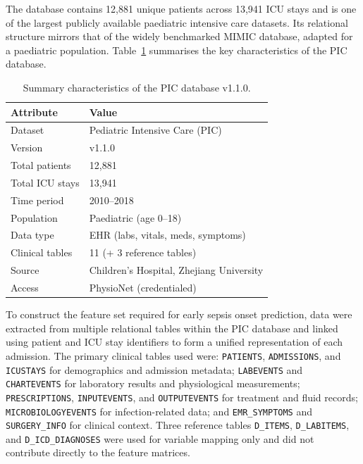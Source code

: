 \documentclass[final,3p,times]{elsarticle}
\begin{document}
The database contains 12,881 unique patients across 13,941 ICU
stays and is one of the largest publicly available paediatric
intensive care datasets. Its relational structure mirrors that of
the widely benchmarked MIMIC database, adapted for a paediatric
population. Table~\ref{tab:pic_summary} summarises the key
characteristics of the PIC database.

\begin{table}[htbp]
\centering
\caption{Summary characteristics of the PIC database v1.1.0.}
\label{tab:pic_summary}
\small
\begin{tabular}{ll}
\toprule
\textbf{Attribute} & \textbf{Value} \\
\midrule
Dataset             & Pediatric Intensive Care (PIC) \\
Version             & v1.1.0 \\
Total patients      & 12,881 \\
Total ICU stays     & 13,941 \\
Time period         & 2010--2018 \\
Population          & Paediatric (age 0--18) \\
Data type           & EHR (labs, vitals, meds, symptoms) \\
Clinical tables     & 11 (+ 3 reference tables) \\
Source              & Children's Hospital, Zhejiang University \\
Access              & PhysioNet (credentialed) \\
\bottomrule
\end{tabular}
\end{table}

To construct the feature set required for early sepsis onset
prediction, data were extracted from multiple relational tables
within the PIC database and linked using patient and ICU stay
identifiers to form a unified representation of each admission.
The primary clinical tables used were: \texttt{PATIENTS},
\texttt{ADMISSIONS}, and \texttt{ICUSTAYS} for demographics and
admission metadata; \texttt{LABEVENTS} and \texttt{CHARTEVENTS}
for laboratory results and physiological measurements;
\texttt{PRESCRIPTIONS}, \texttt{INPUTEVENTS}, and
\texttt{OUTPUTEVENTS} for treatment and fluid records;
\texttt{MICROBIOLOGYEVENTS} for infection-related data; and
\texttt{EMR\_SYMPTOMS} and \texttt{SURGERY\_INFO} for clinical
context. Three reference tables  \texttt{D\_ITEMS},
\texttt{D\_LABITEMS}, and \texttt{D\_ICD\_DIAGNOSES}  were
used for variable mapping only and did not contribute directly to
the feature matrices.
\end{document}
